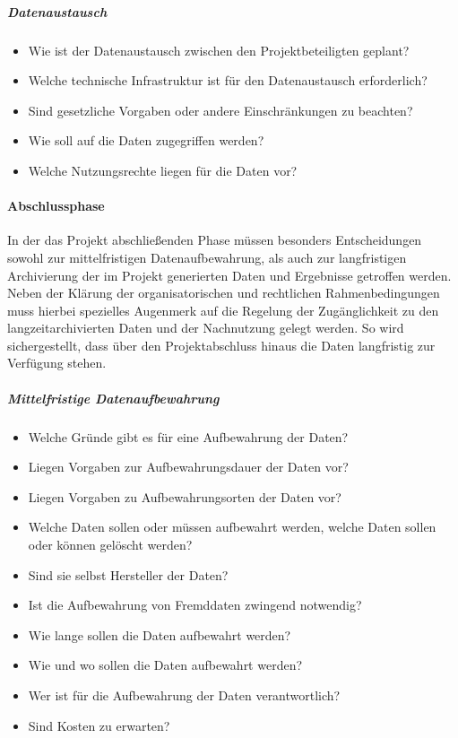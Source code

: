 \subparagraph{Datenaustausch}
\begin{itemize}
    \item Wie ist der Datenaustausch zwischen den Projektbeteiligten geplant?
    \item Welche technische Infrastruktur ist für den Datenaustausch erforderlich?
    \item Sind gesetzliche Vorgaben oder andere Einschränkungen zu beachten?
    \item Wie soll auf die Daten zugegriffen werden?
    \item Welche Nutzungsrechte liegen für die Daten vor?
\end{itemize}


\label{dmp-abschluss}\paragraph{Abschlussphase}
In der das Projekt abschließenden Phase müssen besonders Entscheidungen sowohl zur mittelfristigen Datenaufbewahrung, als auch zur langfristigen Archivierung der im Projekt generierten Daten und Ergebnisse getroffen werden. Neben der Klärung der organisatorischen und rechtlichen Rahmenbedingungen muss hierbei spezielles Augenmerk auf die Regelung der Zugänglichkeit zu den langzeitarchivierten Daten und der Nachnutzung gelegt werden. So wird sichergestellt, dass über den Projektabschluss hinaus die Daten langfristig zur Verfügung stehen. 

\subparagraph{Mittelfristige Datenaufbewahrung}
\begin{itemize}
    \item Welche Gründe gibt es für eine Aufbewahrung der Daten?
    \item Liegen Vorgaben zur Aufbewahrungsdauer der Daten vor?
    \item Liegen Vorgaben zu Aufbewahrungsorten der Daten vor?
    \item Welche Daten sollen oder müssen aufbewahrt werden, welche Daten sollen oder können gelöscht werden?
    \item Sind sie selbst Hersteller der Daten?
    \item Ist die Aufbewahrung von Fremddaten zwingend notwendig?
    \item Wie lange sollen die Daten aufbewahrt werden?
    \item Wie und wo sollen die Daten aufbewahrt werden?
    \item Wer ist für die Aufbewahrung der Daten verantwortlich?
    \item Sind Kosten zu erwarten?
\end{itemize}

